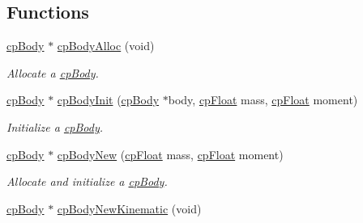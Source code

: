 \subsection*{Functions}
\begin{DoxyCompactItemize}
\item 
\hypertarget{group__cp_body_gadd622b6503c89fa5a8c0f43a0917d2a2}{}\hyperlink{structcp_body}{cp\+Body} $\ast$ \hyperlink{group__cp_body_gadd622b6503c89fa5a8c0f43a0917d2a2}{cp\+Body\+Alloc} (void)\label{group__cp_body_gadd622b6503c89fa5a8c0f43a0917d2a2}

\begin{DoxyCompactList}\small\item\em Allocate a \hyperlink{structcp_body}{cp\+Body}. \end{DoxyCompactList}\item 
\hypertarget{group__cp_body_ga043253365e8e829f88aaf6e7ff7679c7}{}\hyperlink{structcp_body}{cp\+Body} $\ast$ \hyperlink{group__cp_body_ga043253365e8e829f88aaf6e7ff7679c7}{cp\+Body\+Init} (\hyperlink{structcp_body}{cp\+Body} $\ast$body, \hyperlink{group__basic_types_gac1ed65573e035bf892505768c852d8d3}{cp\+Float} mass, \hyperlink{group__basic_types_gac1ed65573e035bf892505768c852d8d3}{cp\+Float} moment)\label{group__cp_body_ga043253365e8e829f88aaf6e7ff7679c7}

\begin{DoxyCompactList}\small\item\em Initialize a \hyperlink{structcp_body}{cp\+Body}. \end{DoxyCompactList}\item 
\hypertarget{group__cp_body_ga91a8a7f7b8703e9bdba794edf4c24c90}{}\hyperlink{structcp_body}{cp\+Body} $\ast$ \hyperlink{group__cp_body_ga91a8a7f7b8703e9bdba794edf4c24c90}{cp\+Body\+New} (\hyperlink{group__basic_types_gac1ed65573e035bf892505768c852d8d3}{cp\+Float} mass, \hyperlink{group__basic_types_gac1ed65573e035bf892505768c852d8d3}{cp\+Float} moment)\label{group__cp_body_ga91a8a7f7b8703e9bdba794edf4c24c90}

\begin{DoxyCompactList}\small\item\em Allocate and initialize a \hyperlink{structcp_body}{cp\+Body}. \end{DoxyCompactList}\item 
\hypertarget{group__cp_body_ga4c0ae4d3a80b3c5275c7bcdb1418e8a6}{}\hyperlink{structcp_body}{cp\+Body} $\ast$ \hyperlink{group__cp_body_ga4c0ae4d3a80b3c5275c7bcdb1418e8a6}{cp\+Body\+New\+Kinematic} (void)\label{group__cp_body_ga4c0ae4d3a80b3c5275c7bcdb1418e8a6}


\end{DoxyCompactItemize}
